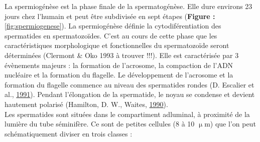 \documentclass[12pt,twoside]{reedthesis}
\theoremstyle{definition}
\theoremstyle{definition}
\theoremstyle{remark}
\begin{document}
  La spermiogénèse est la phase finale de la spermatogénèse. Elle dure
  environs 23 jours chez l'humain et peut être subdivisée en sept étapes
  (\textbf{Figure : }\ref{fig:spermiogenese}). La spermiogénèse définie la
  cytodiférentiation des spermatides en spermatozoïdes. C'est au cours de
  cette phase que les caractéristiques morphologique et fonctionnelles du
  spermatozoïde seront déterminées (Clermont \& Oko 1993 à trouver !!!).
  Elle est caractérisée par 3 évènements majeurs : la formation de
  l'acrosome, la compaction de l'ADN nucléaire et la formation du
  flagelle. Le développement de l'acrosome et la formation du flagelle
  commence au niveau des spermatides rondes (D. Escalier et al.,
  \protect\hyperlink{ref-Escalier1991}{1991}). Pendant l'élongation de la
  spermatide, le noyau se condense et devient hautement polarisé
  (Hamilton, D. W., Waites, \protect\hyperlink{ref-Hamilton1987}{1990}).\\
  Les spermatides sont situées dans le compartiment adluminal, à proximité
  de la lumière du tube séminifère. Ce sont de petites cellules (8 à 10
  \(\upmu\)m) que l'on peut schématiquement diviser en trois classes :
  
\end{document}
